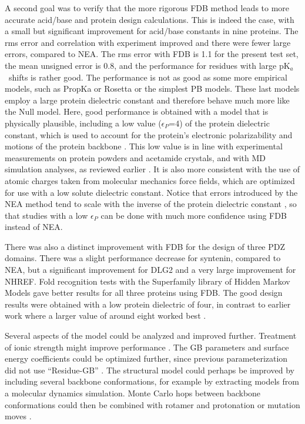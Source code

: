 \documentclass[a4paper,12pt]{article}
\newcommand{\pk}{pK$_a$}
\begin{document}
A second goal was to verify that the more rigorous FDB method leads to more accurate acid/base and protein design calculations.
This is indeed the case, with a small but significant improvement for acid/base constants in nine proteins. The rms error
and correlation with experiment improved and there were fewer large errors, compared to NEA. The rms error with FDB is 1.1
for the present test set, the mean unsigned error is 0.8, and the performance for residues with large \pk\ shifts is rather
good. The performance is not as good as some more empirical models, such as PropKa or Rosetta \cite{Kilambi12} or the simplest
PB models. These last models employ a large protein dielectric constant and therefore behave much more like the Null model.
Here, good performance is obtained with a model that is physically plausible, including a low value ($\epsilon_P$=4) of the
protein dielectric constant, which is used to account for the protein's electronic polarizability and motions of the protein
backbone \cite{Simonson13c}. This low value is in line with experimental measurements on protein powders and acetamide crystals,
and with MD simulation analyses, as reviewed earlier \cite{Simonson03}. It is also more consistent with the use of atomic charges
taken from molecular mechanics force fields, which are optimized for use with a low solute dielectric constant. Notice that
errors introduced by the NEA method tend to scale with the inverse of the protein dielectric constant \cite{Polydorides13,
Gaillard14}, so that studies with a low $\epsilon_P$ can be done with much more confidence using FDB instead of NEA.

There was also a distinct improvement with FDB for the design of three PDZ domains. There was a slight performance
decrease for syntenin, compared to NEA, but a significant improvement for DLG2 and a very large improvement for NHREF.
Fold recognition tests with the Superfamily library of Hidden Markov Models gave better results for all three proteins
using FDB. The good design results were obtained with a low protein dielectric of four, in contrast to earlier work where
a larger value of around eight worked best \cite{Mignon17}.

Several aspects of the model could be analyzed and improved further. Treatment of ionic strength might improve performance
\cite{Srinivasan99,Polydorides13}. The GB parameters and surface energy coefficients could be optimized further, since
previous parameterization did not use ``Residue-GB'' \cite{Lopes07}. The structural model could perhaps be improved by
including several backbone conformations, for example by extracting models from a molecular dynamics simulation. Monte
Carlo hops between backbone conformations could then be combined with rotamer and protonation or mutation moves \cite{Druart17}.
\end{document}
